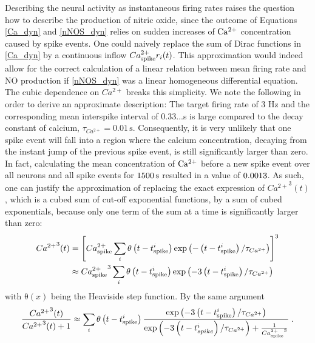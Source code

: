\documentclass[10pt,a4paper]{article}
\begin{document}
Describing the neural activity as instantaneous firing rates raises the question how to describe the production of nitric oxide, since the outcome of Equations \eqref{Ca_dyn} and \eqref{nNOS_dyn} relies on sudden increases of $\rm Ca^{2+}$ concentration caused by spike events. One could naively replace the sum of Dirac functions in \eqref{Ca_dyn} by a continuous inflow $Ca^{2+}_{\rm spike} r_i(t)$. This approximation would indeed allow for the correct calculation of a linear relation between mean firing rate and NO production if \eqref{nNOS_dyn} was a linear homogeneous differential equation. The cubic dependence on $Ca^{2+}$ breaks this simplicity. We note the following in order to derive an approximate description: The target firing rate of 3 Hz and the corresponding mean interspike interval of 0.33...s is large compared to the decay constant of calcium, $\tau_{Ca^{2+}} = \mathrm{0.01\,s}$. Consequently, it is very unlikely that one spike event will fall into a region where the calcium concentration, decaying from the instant jump of the previous spike event, is still significantly larger than zero. In fact, calculating the mean concentration of $\rm Ca^{2+}$ before a new spike event over all neurons and all spike events for $\rm 1500\,s$ resulted in a value of $\rm 0.0013$. As such, one can justify the approximation of replacing the exact expression of ${Ca^{2+}}^3(t)$, which is a cubed sum of cut-off exponential functions, by a sum of cubed exponentials, because only one term of the sum at a time is significantly larger than zero:
\begin{equation}
\begin{split}
{Ca^{2+}}^3(t) &= \left[ Ca^{2+}_{\rm spike} \sum_{i} \mathrm{\theta} \left( t-t^i_{\rm spike} \right) \mathrm{exp} \left( - \left( t-t^i_{\rm spike} \right) /\tau_{Ca^{2+}} \right) \right]^3 \\
&\approx {Ca_{\rm spike}^{2+}}^3 \sum_{i} \mathrm{\theta} \left( t-t^i_{\rm spike} \right) \mathrm{exp} \left( -3 \left( t-t^i_{\rm spike} \right) /\tau_{Ca^{2+}} \right) 
\end{split} \label{cubic_approx_1}			
\end{equation}
with $\mathrm{\theta}(x)$ being the Heaviside step function. By the same argument
\begin{equation}
\frac{{Ca^{2+}}^3(t)}{{Ca^{2+}}^3(t)+1} \approx \sum_{i} \mathrm{\theta} \left( t-t^i_{\rm spike} \right) \frac{ \mathrm{exp} \left( -3 \left( t-t^i_{\rm spike} \right) /\tau_{Ca^{2+}} \right) }{\mathrm{exp} \left( -3 \left( t-t^i_{spike} \right) /\tau_{Ca^{2+}} \right) + \frac{1}{{Ca_{\rm spike}^{2+}}^3}} \; .
\end{equation}
\end{document}

